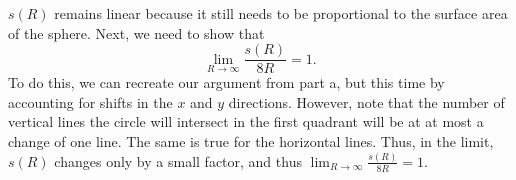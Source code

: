 \documentclass[11pt]{article}
\begin{document}
\begin{enumerate}
\begin{enumerate}
\begin{solution}
        $s(R)$ remains linear because it still needs to be proportional to the surface area of the sphere. 
        Next, we need to show that \[\lim_{R\to \infty}\frac{s(R)}{8R} = 1.\] To do this, we can recreate our argument from part a, but this time by accounting for shifts in the $x$ and $y$ directions. However, note that the number of vertical lines the circle will intersect in the first quadrant will be at at most a change of one line. The same is true for the horizontal lines. Thus, in the limit, $s(R)$ changes only by a small factor, and thus $\lim_{R\to \infty}\frac{s(R)}{8R} = 1.$
    \end{solution}
\end{enumerate}



\end{enumerate}
\end{document}
